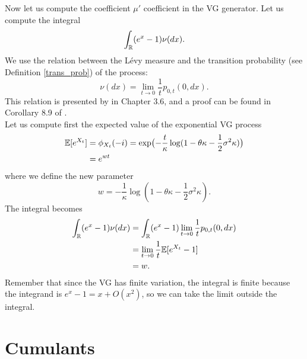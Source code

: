 Now let us compute the coefficient $\mu'$ coefficient in the VG generator. Let us compute the integral
$$ \int_{\mathbb{R}} (e^x-1) \nu(dx). $$
We use the relation between the Lévy measure and the transition probability (see Definition \ref{trans_prob}) of the process:
\begin{equation}
 \nu(dx) = \lim_{t\to 0} \frac{1}{t} p_{0,t}(0,dx) .
\end{equation}
This relation is presented by \cite{Cont} in Chapter 3.6, and a proof can be found in Corollary 8.9 of \cite{Sato}. \\
Let us compute first the expected value of the exponential VG process
\begin{align*}
\mathbb{E}[ e^{X_t}] &= \phi_{X_t}(-i) = \exp \bigl( -\frac{t}{\kappa} \log(1-\theta \kappa -\frac{1}{2}\sigma^2 \kappa ) \bigr)\\
 &= e^{w t}
\end{align*}
where we define the new parameter 
\begin{equation}
 w = - \frac{1}{\kappa} \log(1-\theta \kappa -\frac{1}{2}\sigma^2 \kappa).
\end{equation}
The integral becomes
\begin{align*}
 \int_{\mathbb{R}} (e^x-1) \nu(dx) &= \int_{\mathbb{R}} (e^x-1) \lim_{t\to 0} \frac{1}{t} p_{0,t}(0,dx) \\ 
         &= \lim_{t\to 0} \frac{1}{t} \mathbb{E}[ e^{X_t} - 1 ] \\
         &= w.
\end{align*}
Remember that since the VG has finite variation, the integral is finite because the integrand is $e^x-1 = x + O(x^2)$,
so we can take the limit outside the integral.\\





\section{Cumulants}\label{cumulant_sec}

